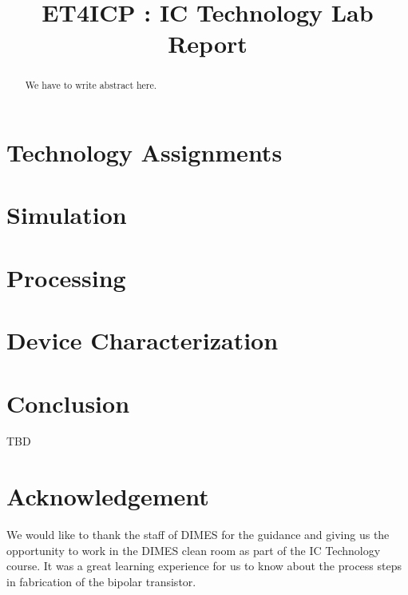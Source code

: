 \documentclass[conference]{IEEEtran}
\begin{document}
\title{ET4ICP : IC Technology Lab Report}
\author{
 
\and {} 
\and {} 
}

\maketitle

\begin{abstract}
We have to write abstract here.
\end{abstract}

\IEEEpeerreviewmaketitle

\section{Technology Assignments}
\label{sec:TechAssignments}


\section{Simulation}
\label{sec:Simulation}


\section{Processing}
\label{sec:Processing}


\section{Device Characterization}
\label{sec:DevChar}


\section{Conclusion}
TBD

\section{Acknowledgement}
We would like to thank the staff of DIMES for the guidance and giving us the opportunity to work in the DIMES clean room as part of the IC Technology course. 
It was a great learning experience for us to know about the process steps in fabrication of the bipolar transistor.



\end{document}
